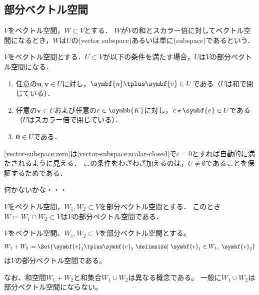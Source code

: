 \documentclass[../sotsu.tex]{subfiles}
\begin{document}
\subsection{部分ベクトル空間}

\begin{definition}[部分ベクトル空間]
    \label{dfn:vector-subspace}
    $V$をベクトル空間，$W \subset V$とする．
    $W$が$V$の和とスカラー倍に対してベクトル空間になるとき，$W$は$U$の(vector subspace)あるいは単に(subspace)であるという．
\end{definition}

\begin{theorem}
    \label{thm:vector-subspace-iff}
    $V$をベクトル空間とする．$U \subset V$が以下の条件を満たす場合，$U$は$V$の部分ベクトル空間になる．
    \begin{enumerate}
        \item \label{vector-subspace:sum-closed} 任意の$\symbf{u}, \symbf{v} \in U$に対し，$\symbf{u} \vecplus \symbf{v} \in U$である（$U$は和で閉じている）．
        \item \label{vector-subspace:scalar-closed} 任意の$\symbf{v} \in U$および任意の$c \in \symbb{K}$に対し，$c \scaprod \symbf{v} \in U$である（$U$はスカラー倍で閉じている）．
        \item \label{vector-subspace:zero} $\symbf{0} \in U$である．
    \end{enumerate}
    \cref{vector-subspace:zero}は\cref{vector-subspace:scalar-closed}で$c=0$とすれば自動的に満たされるように見える．
    この条件をわざわざ加えるのは，$U \neq \emptyset$であることを保証するためである．
\end{theorem}

\begin{example}
    何かないかな・・・
\end{example}

\begin{example}
    $V$をベクトル空間，$W_1, W_2 \subset V$を部分ベクトル空間とする．
    このとき$W \coloneq W_1 \cap W_2 \subset V$は$V$の部分ベクトル空間である．
\end{example}


\begin{definition}[和空間]
    \label{dfn:sum-of-vector-space}
    $V$をベクトル空間、$W_1, W_2 \subset V$を部分ベクトル空間とする。
    \begin{equation}
        W_1 + W_2 \coloneq \Set{  \symbf{v}_1 \vecplus \symbf{v}_2  \given  \symbf{v}_1 \in W_1, \  \symbf{v}_2  }
    \end{equation}
    は$V$の部分ベクトル空間である。
\end{definition}
なお、和空間$W_1 + W_2$と和集合$W_1 \cup W_2$は異なる概念である。
一般に$W_1 \cup W_2$は部分ベクトル空間にならない。
\end{document}

